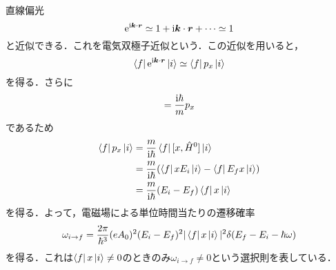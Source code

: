 \documentclass{report}
\begin{document}
\begin{myex}{直線偏光}{}
    \begin{equation}
      \mathrm{e}^{\mathrm{i}\bm{k}\cdot\bm{r}}\simeq 1 + \mathrm{i} \bm{k} \cdot \bm{r} + \cdots \simeq 1
    \end{equation}
    と近似できる．これを電気双極子近似という．この近似を用いると，
    \begin{equation}
      \bra{f} \mathrm{e}^{\mathrm{i} \bm{k} \cdot \bm{r}} \ket{i} \simeq \bra{f} p_x \ket{i}
    \end{equation}
    を得る．さらに
    \begin{equation}
      [x,\hat{H}^0] = \frac{\i \hbar}{m} p_x
    \end{equation}
    であるため
    \begin{align}
      \bra{f} p_x \ket{i} &= \frac{m}{\mathrm{i}\hbar} \bra{f} [x,\hat{H}^0] \ket{i}\\
      &= \frac{m}{\mathrm{i}\hbar} \qty(\bra{f}xE_i\ket{i} - \bra{f} E_f x \ket{i})\\
      &= \frac{m}{\mathrm{i}\hbar} (E_i - E_f)\bra{f}x\ket{i}
    \end{align}
    を得る．よって，電磁場による単位時間当たりの遷移確率
    \begin{equation}
     \omega_{i \to f} = \frac{2 \pi}{\hbar^3} (eA_0)^2 (E_i - E_f)^2 |\bra{f} x \ket{i}|^2 \delta(E_f - E_i - \hbar\omega) 
    \end{equation}
    を得る．これは$\bra{f} x \ket{i} \ne 0$のときのみ$\omega_{i\to f} \ne 0$という選択則を表している．
  \end{myex}
\end{document}
